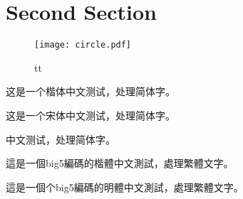 \documentclass[UTF8]{article} %
\begin{document}
    \section{Second Section}

\begin{figure}[h]
  \centering
  \texttt{[image: circle.pdf]}
  \caption{tt}
  \label{fig3}
\end{figure}

\begin{CJK}{UTF8}{gkai}
这是一个楷体中文测试，处理简体字。
\end{CJK}

\begin{CJK}{UTF8}{gbsn}
这是一个宋体中文测试，处理简体字。
\end{CJK}

\begin{CJK}{UTF8}{gbsnlp}
中文测试，处理简体字。
\end{CJK}

\begin{CJK}{UTF8}{bkai}
這是一個big5編碼的楷體中文測試，處理繁體文字。
\end{CJK}

\begin{CJK}{UTF8}{bsmi}
這是一個个big5編碼的明體中文測試，處理繁體文字。
\end{CJK}
\end{document}
